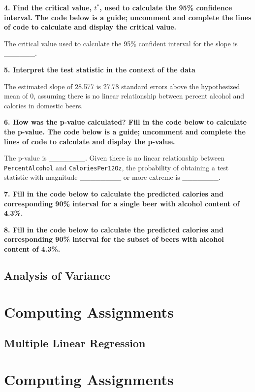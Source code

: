 \documentclass[]{book}
\begin{document}
\textbf{4. Find the critical value, \(t^*\), used to calculate the 95\%
confidence interval. The code below is a guide; uncomment and complete
the lines of code to calculate and display the critical value.}

The critical value used to calculate the 95\% confident interval for the
slope is \_\_\_\_\_\_.

\textbf{5. Interpret the test statistic in the context of the data}

The estimated slope of 28.577 is 27.78 standard errors above the
hypothesized mean of 0, assuming there is no linear relationship between
percent alcohol and calories in domestic beers.

\textbf{6. How was the p-value calculated? Fill in the code below to
calculate the p-value. The code below is a guide; uncomment and complete
the lines of code to calculate and display the p-value.}

The p-value is \_\_\_\_\_\_\_. Given there is no linear relationship
between \texttt{PercentAlcohol} and \texttt{CaloriesPer12Oz}, the
probability of obtaining a test statistic with magnitude
\_\_\_\_\_\_\_\_ or more extreme is \_\_\_\_\_\_\_.

\textbf{7. Fill in the code below to calculate the predicted calories
and corresponding 90\% interval for a single beer with alcohol content
of 4.3\%.}

\textbf{8. Fill in the code below to calculate the predicted calories
and corresponding 90\% interval for the subset of beers with alcohol
content of 4.3\%.}

\chapter{Analysis of Variance}\label{anova}

\part*{Computing
Assignments}\label{part-computing-assignments}

\chapter{Multiple Linear Regression}\label{mlr}

\part*{Computing
Assignments}\label{part-computing-assignments-1}
\end{document}
